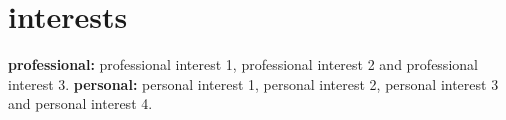 \documentclass[]{cv-style}          %
\begin{document}







\section{interests}
  \vspace{-0.2cm}

\textbf{professional:} professional interest 1, professional interest 2 and professional interest 3. \textbf{personal:} personal interest 1, personal interest 2, personal interest 3 and personal interest 4.

\end{document}
